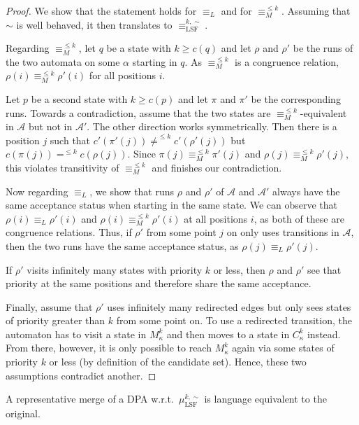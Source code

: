 \begin{proof}
	We show that the statement holds for $\equiv_L$ and for $\equiv_M^{\leq k}$. Assuming that $\sim$ is well behaved, it then translates to $\equiv_\text{LSF}^{k,\sim}$.
	
	Regarding $\equiv_M^{\leq k}$, let $q$ be a state with $k \geq c(q)$ and let $\rho$ and $\rho'$ be the runs of the two automata on some $\alpha$ starting in $q$. As $\equiv_M^{\leq k}$ is a congruence relation, $\rho(i) \equiv_M^{\leq k} \rho'(i)$ for all positions $i$. 
	
	Let $p$ be a second state with $k \geq c(p)$ and let $\pi$ and $\pi'$ be the corresponding runs. Towards a contradiction, assume that the two states are $\equiv_M^{\leq k}$-equivalent in $\mathcal{A}$ but not in $\mathcal{A}'$. The other direction works symmetrically. Then there is a position $j$ such that $c'(\pi'(j)) \neq^{\leq k} c'(\rho'(j))$ but $c(\pi(j)) =^{\leq k} c(\rho(j))$. Since $\pi(j) \equiv_M^{\leq k} \pi'(j)$ and $\rho(j) \equiv_M^{\leq k} \rho'(j)$, this violates transitivity of $\equiv_M^{\leq k}$ and finishes our contradiction.
	
	\vspace{5pt}
	
	Now regarding $\equiv_L$, we show that runs $\rho$ and $\rho'$ of $\mathcal{A}$ and $\mathcal{A}'$ always have the same acceptance status when starting in the same state. We can observe that $\rho(i) \equiv_L \rho'(i)$ and $\rho(i) \equiv_M^{\leq k} \rho'(i)$ at all positions $i$, as both of these are congruence relations. Thus, if $\rho'$ from some point $j$ on only uses transitions in $\mathcal{A}$, then the two runs have the same acceptance status, as $\rho(j) \equiv_L \rho'(j)$.
	
	If $\rho'$ visits infinitely many states with priority $k$ or less, then $\rho$ and $\rho'$ see that priority at the same positions and therefore share the same acceptance.
	
	Finally, assume that $\rho'$ uses infinitely many redirected edges but only sees states of priority greater than $k$ from some point on. To use a redirected transition, the automaton has to visit a state in $M_\kappa^k$ and then moves to a state in $C_\kappa^k$ instead. From there, however, it is only possible to reach $M_\kappa^k$ again via some states of priority $k$ or less (by definition of the candidate set). Hence, these two assumptions contradict another.
\end{proof}

\begin{theorem}
	A representative merge of a DPA w.r.t.\ $\mu_\text{LSF}^{k,\sim}$ is language equivalent to the original.
\end{theorem}

